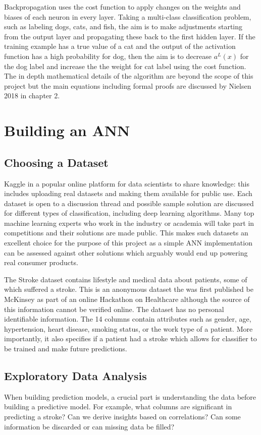 \documentclass[proposal]{softeng}
\begin{document}
Backpropagation uses the cost function to apply changes on the weights and biases of each neuron in every layer. Taking a multi-class classification problem, such as labeling dogs, cats, and fish, the aim is to make adjustments starting from the output layer and propagating these back to the first hidden layer. If the training example has a true value of a cat and the output of the activation function has a high probability for dog, then the aim is to decrease \( a^L(x) \) for the dog label and increase the the weight for cat label using the cost function. The in depth mathematical details of the algorithm are beyond the scope of this project but the main equations including formal proofs are discussed by Nielsen 2018 \cite{nielsenneural} in chapter 2.

\section{Building an ANN}
\subsection{Choosing a Dataset}
Kaggle\cite{kaggle} in a popular online platform for data scientists to share knowledge: this includes uploading real datasets and making them available for public use. Each dataset is open to a discussion thread and possible sample solution are discussed for different types of classification, including deep learning algorithms. Many top machine learning experts who work in the industry or academia will take part in competitions and their solutions are made public. This makes such datasets an excellent choice for the purpose of this project as a simple ANN implementation can be assessed against other solutions which arguably would end up powering real consumer products.

The Stroke dataset\cite{strokedataset} contains lifestyle and medical data about patients, some of which suffered a stroke. This is an anonymous dataset the was first published be McKinsey as part of an online Hackathon on Healthcare although the source of this information cannot be verified online. The dataset has no personal identifiable information. The 14 columns contain attributes such as gender, age, hypertension, heart disease, smoking status, or the work type of a patient. More importantly, it also specifies if a patient had a stroke which allows for classifier to be trained and make future predictions.

\subsection{Exploratory Data Analysis}
When building prediction models, a crucial part is understanding the data before building a predictive model. For example, what columns are significant in predicting a stroke? Can we derive insights based on correlations? Can some information be discarded or can missing data be filled? 
\end{document}
